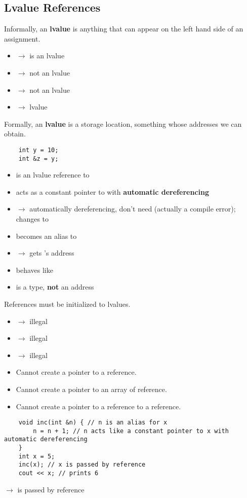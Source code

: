 \subsection{Lvalue References}
Informally, an \textbf{lvalue} is anything that can appear on the left hand side of
an assignment.
\begin{itemize}
    \item {} $ \rightarrow $  is an lvalue
    \item {} $ \rightarrow $ not an lvalue
    \item {} $ \rightarrow $ not an lvalue
    \item {} $ \rightarrow $  lvalue
\end{itemize}
Formally, an \textbf{lvalue} is a storage location, something whose addresses we
can obtain.
\begin{lstlisting}
    int y = 10;
    int &z = y;
\end{lstlisting}
\begin{itemize}
    \item {} is an lvalue reference to 
    \item {} acts as a constant pointer to  with
    \textbf{automatic dereferencing}
    \item {} $ \rightarrow $ automatically dereferencing,
    don't need  (actually a compile error); changes  to 
    \item {} becomes an alias to 
    \item {} $ \rightarrow $ gets 's address
    \item {} behaves like 
    \item {} is a type, \textbf{not} an address
\end{itemize}
References must be initialized to lvalues.
\begin{itemize}
    \item {} $ \rightarrow $ illegal
    \item {} $ \rightarrow $ illegal
    \item {} $ \rightarrow $ illegal
\end{itemize}
\begin{itemize}
    \item Cannot create a pointer to a reference.
    \item Cannot create a pointer to an array of reference.
    \item Cannot create a pointer to a reference to a reference.
\end{itemize}
\begin{lstlisting}
    void inc(int &n) { // n is an alias for x
        n = n + 1; // n acts like a constant pointer to x with automatic dereferencing
    }
    int x = 5;
    inc(x); // x is passed by reference
    cout << x; // prints 6
\end{lstlisting}
 $ \rightarrow $  is passed by reference
